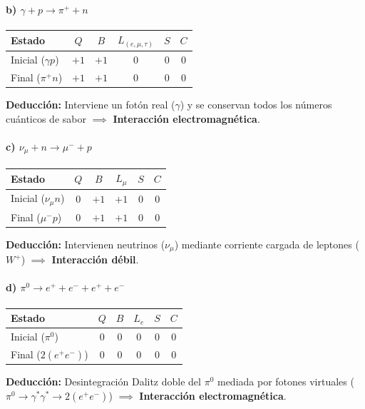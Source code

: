 \begin{problema}
\paragraph{b) $\gamma + p \rightarrow \pi^+ + n$}
\begin{center}
\small
\begin{tabular}{lccccc}
\toprule
\textbf{Estado} & $Q$ & $B$ & $L_{(e,\mu,\tau)}$ & $S$ & $C$ \\
\midrule
Inicial ($\gamma p$) & $+1$ & $+1$ & $0$ & $0$ & $0$ \\
Final ($\pi^+ n$) & $+1$ & $+1$ & $0$ & $0$ & $0$ \\
\bottomrule
\end{tabular}
\end{center}
\textbf{Deducción:} Interviene un fotón real ($\gamma$) y se conservan todos los números cuánticos de sabor $\implies$ \textbf{Interacción electromagnética}.

\paragraph{c) $\nu_\mu + n \rightarrow \mu^- + p$}
\begin{center}
\small
\begin{tabular}{lccccc}
\toprule
\textbf{Estado} & $Q$ & $B$ & $L_\mu$ & $S$ & $C$ \\
\midrule
Inicial ($\nu_\mu n$) & $0$ & $+1$ & $+1$ & $0$ & $0$ \\
Final ($\mu^- p$) & $0$ & $+1$ & $+1$ & $0$ & $0$ \\
\bottomrule
\end{tabular}
\end{center}
\textbf{Deducción:} Intervienen neutrinos ($\nu_\mu$) mediante corriente cargada de leptones ($W^+$) $\implies$ \textbf{Interacción débil}.

\paragraph{d) $\pi^0 \rightarrow e^+ + e^- + e^+ + e^-$}
\begin{center}
\small
\begin{tabular}{lccccc}
\toprule
\textbf{Estado} & $Q$ & $B$ & $L_e$ & $S$ & $C$ \\
\midrule
Inicial ($\pi^0$) & $0$ & $0$ & $0$ & $0$ & $0$ \\
Final ($2(e^+ e^-)$) & $0$ & $0$ & $0$ & $0$ & $0$ \\
\bottomrule
\end{tabular}
\end{center}
\textbf{Deducción:} Desintegración Dalitz doble del $\pi^0$ mediada por fotones virtuales ($\pi^0 \to \gamma^* \gamma^* \to 2(e^+ e^-)$) $\implies$ \textbf{Interacción electromagnética}.


\end{problema}
